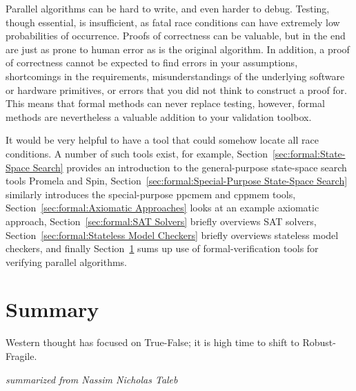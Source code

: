 
%


Parallel algorithms can be hard to write, and even harder to debug.
Testing, though essential, is insufficient, as fatal race conditions
can have extremely low probabilities of occurrence.
Proofs of correctness can be valuable, but in the end are just as
prone to human error as is the original algorithm.
In addition, a proof of correctness cannot be expected to find errors
in your assumptions, shortcomings in the requirements,
misunderstandings of the underlying software or hardware primitives,
or errors that you did not think to construct a proof for.
This means that formal methods can never replace testing, however,
formal methods are nevertheless a valuable addition to your validation toolbox.

It would be very helpful to have a tool that could somehow locate
all race conditions.
A number of such tools exist, for example,
Section~\ref{sec:formal:State-Space Search} provides an
introduction to the general-purpose state-space search tools Promela and Spin,
Section~\ref{sec:formal:Special-Purpose State-Space Search}
similarly introduces the special-purpose ppcmem and cppmem tools,
Section~\ref{sec:formal:Axiomatic Approaches}
looks at an example axiomatic approach,
Section~\ref{sec:formal:SAT Solvers}
briefly overviews SAT solvers,
Section~\ref{sec:formal:Stateless Model Checkers}
briefly overviews stateless model checkers,
and finally
Section~\ref{sec:formal:Summary}
sums up use of formal-verification tools for verifying parallel algorithms.








\section{Summary}
\label{sec:formal:Summary}
%
\epigraph{Western thought has focused on True-False;
	  it is high time to shift to Robust-Fragile.}
	 {\emph{summarized from Nassim Nicholas Taleb}}

